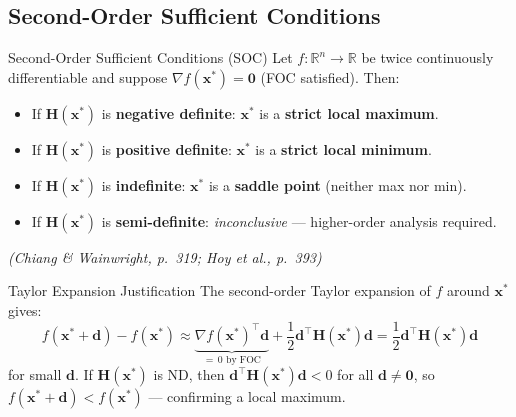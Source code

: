 \documentclass[12pt, a4paper]{article}
\theoremstyle{definition}
\newcommand{\R}{\mathbb{R}}
\newcommand{\bx}{\mathbf{x}}
\newcommand{\bz}{\mathbf{0}}
\newcommand{\bH}{\mathbf{H}}
\begin{document}
\subsection{Second-Order Sufficient Conditions}

\begin{thmbox}{Second-Order Sufficient Conditions (SOC)}
Let $f: \R^n \to \R$ be twice continuously differentiable and suppose
$\nabla f(\bx^*) = \bz$ (FOC satisfied). Then:
\begin{itemize}
  \item If $\bH(\bx^*)$ is \textbf{negative definite}: $\bx^*$ is a
        \textbf{strict local maximum}.
  \item If $\bH(\bx^*)$ is \textbf{positive definite}: $\bx^*$ is a
        \textbf{strict local minimum}.
  \item If $\bH(\bx^*)$ is \textbf{indefinite}: $\bx^*$ is a
        \textbf{saddle point} (neither max nor min).
  \item If $\bH(\bx^*)$ is \textbf{semi-definite}: \emph{inconclusive}
        --- higher-order analysis required.
\end{itemize}
\emph{(Chiang \& Wainwright, p.\ 319; Hoy et al., p.\ 393)}
\end{thmbox}

\begin{keybox}{Taylor Expansion Justification}
The second-order Taylor expansion of $f$ around $\bx^*$ gives:
\[
  f(\bx^* + \mathbf{d}) - f(\bx^*)
  \approx \underbrace{\nabla f(\bx^*)^\top \mathbf{d}}_{=\,0\text{ by FOC}}
  + \frac{1}{2}\mathbf{d}^\top \bH(\bx^*)\mathbf{d}
  = \frac{1}{2}\mathbf{d}^\top \bH(\bx^*)\mathbf{d}
\]
for small $\mathbf{d}$. If $\bH(\bx^*)$ is ND, then
$\mathbf{d}^\top \bH(\bx^*)\mathbf{d} < 0$ for all $\mathbf{d} \neq \bz$,
so $f(\bx^*+\mathbf{d}) < f(\bx^*)$ --- confirming a local maximum.
\end{keybox}
\end{document}
